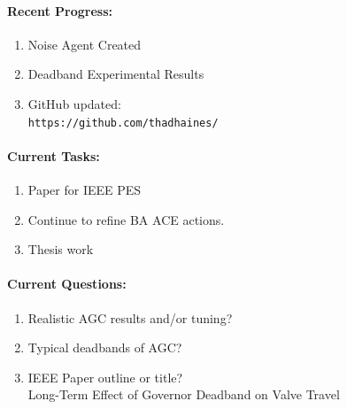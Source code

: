 \documentclass[12pt]{article}
\begin{document}
\begin{multicols}{2}
\raggedright
	\paragraph{Recent Progress:}
	\begin{enumerate}
\itemsep0em 
		\item Noise Agent Created

		\item Deadband Experimental Results


		\item GitHub updated:\\
		\verb|https://github.com/thadhaines/|
		
	\end{enumerate}
\paragraph{Current Tasks:}
	\begin{enumerate}
		\itemsep0em 
		\item Paper for IEEE PES
		\item Continue to refine BA ACE actions.
		\item Thesis work 
		

	\end{enumerate}

	\paragraph{Current Questions:}
	\begin{enumerate}
\itemsep0em 
	\item Realistic AGC results and/or tuning?
	\item Typical deadbands of AGC? 
	\item IEEE Paper outline or title?\\Long-Term Effect of Governor Deadband on Valve Travel
	\end{enumerate}
	

\end{multicols}
\end{document}

